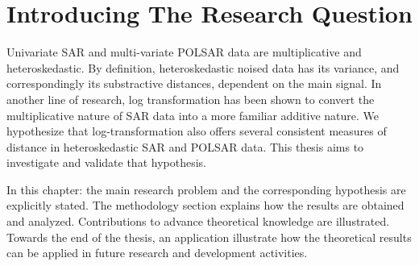 \chapter{Introducing The Research Question}



Univariate SAR and multi-variate POLSAR data are multiplicative and heteroskedastic.
By definition, heteroskedastic noised data has its variance, and correspondingly its substractive distances,
  dependent on the main signal.
In another line of research, log transformation has been shown
  to convert the multiplicative nature of SAR data into a more familiar additive nature.
We hypothesize that   
  log-transformation also offers several consistent measures of distance in heteroskedastic SAR and POLSAR data.
This thesis aims to investigate and validate that hypothesis.

In this chapter: the main research problem and the corresponding hypothesis are explicitly stated.
The methodology section explains how the results are obtained and analyzed.
Contributions to advance theoretical knowledge are illustrated.
Towards the end of the thesis, an application illustrate how the theoretical results can be applied in future research and development activities.
  

